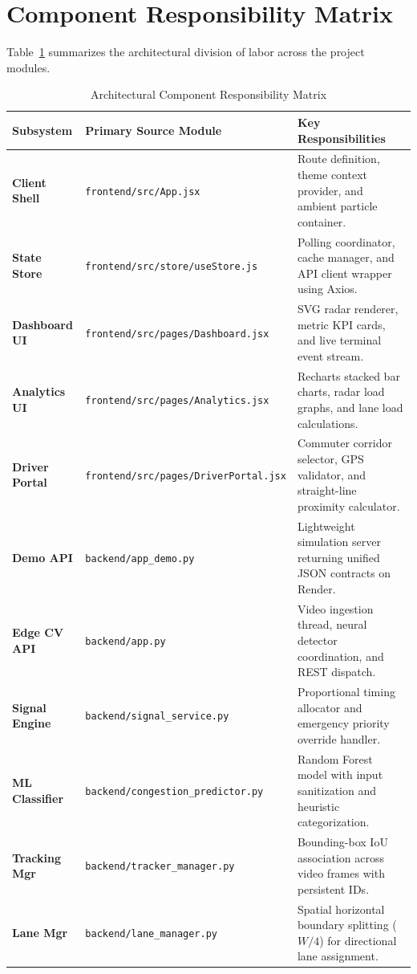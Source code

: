 \section{Component Responsibility Matrix}
Table~\ref{tab:comp_responsibility} summarizes the architectural division of labor across the project modules.

\begin{table}[h!]
\centering
\small
\begin{tabularx}{\textwidth}{l p{4.2cm} X}
\toprule
\textbf{Subsystem} & \textbf{Primary Source Module} & \textbf{Key Responsibilities} \\
\midrule
\textbf{Client Shell} & \texttt{frontend/src/App.jsx} & Route definition, theme context provider, and ambient particle container. \\
\textbf{State Store} & \texttt{frontend/src/store/useStore.js} & Polling coordinator, cache manager, and API client wrapper using Axios. \\
\textbf{Dashboard UI} & \texttt{frontend/src/pages/Dashboard.jsx} & SVG radar renderer, metric KPI cards, and live terminal event stream. \\
\textbf{Analytics UI} & \texttt{frontend/src/pages/Analytics.jsx} & Recharts stacked bar charts, radar load graphs, and lane load calculations. \\
\textbf{Driver Portal} & \texttt{frontend/src/pages/DriverPortal.jsx} & Commuter corridor selector, GPS validator, and straight-line proximity calculator. \\
\textbf{Demo API} & \texttt{backend/app\_demo.py} & Lightweight simulation server returning unified JSON contracts on Render. \\
\textbf{Edge CV API} & \texttt{backend/app.py} & Video ingestion thread, neural detector coordination, and REST dispatch. \\
\textbf{Signal Engine} & \texttt{backend/signal\_service.py} & Proportional timing allocator and emergency priority override handler. \\
\textbf{ML Classifier} & \texttt{backend/congestion\_predictor.py} & Random Forest model with input sanitization and heuristic categorization. \\
\textbf{Tracking Mgr} & \texttt{backend/tracker\_manager.py} & Bounding-box IoU association across video frames with persistent IDs. \\
\textbf{Lane Mgr} & \texttt{backend/lane\_manager.py} & Spatial horizontal boundary splitting ($W/4$) for directional lane assignment. \\
\bottomrule
\end{tabularx}
\caption{Architectural Component Responsibility Matrix}
\label{tab:comp_responsibility}
\end{table}

